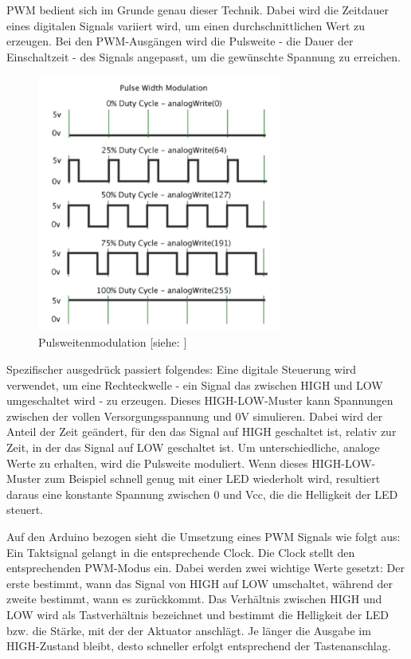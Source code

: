 \ac{PWM} bedient sich im Grunde genau dieser Technik.
Dabei wird die Zeitdauer eines digitalen Signals variiert wird, um einen durchschnittlichen Wert zu erzeugen.
Bei den \ac{PWM}-Ausgängen wird die Pulsweite - die Dauer der Einschaltzeit - des Signals angepasst, um die gewünschte Spannung zu erreichen.

\begin{figure}[htbp]
	\centering
	\includegraphics [width=8cm] {img/pulsweite}
	\caption{Pulsweitenmodulation [siehe: \cite*[siehe ][]{PWM}]}
	\label{fig:pulsweite}
\end{figure}

Spezifischer ausgedrück passiert folgendes:
Eine digitale Steuerung wird verwendet, um eine Rechteckwelle - ein Signal das zwischen HIGH und LOW umgeschaltet wird - zu erzeugen.
Dieses HIGH-LOW-Muster kann Spannungen zwischen der vollen Versorgungsspannung und 0V simulieren.
Dabei wird der Anteil der Zeit geändert, für den das Signal auf HIGH geschaltet ist, relativ zur Zeit, in der das Signal auf LOW geschaltet ist.
Um unterschiedliche, analoge Werte zu erhalten, wird die Pulsweite moduliert.
Wenn dieses HIGH-LOW-Muster zum Beispiel schnell genug mit einer LED wiederholt wird, resultiert daraus eine konstante Spannung zwischen 0 und Vcc, die die Helligkeit der LED steuert. %

Auf den Arduino bezogen sieht die Umsetzung eines \ac{PWM} Signals wie folgt aus:
Ein Taktsignal gelangt in die entsprechende Clock.
Die Clock stellt den entsprechenden \ac{PWM}-Modus ein.
Dabei werden zwei wichtige Werte gesetzt:
Der erste bestimmt, wann das Signal von HIGH auf LOW umschaltet, während der zweite bestimmt, wann es zurückkommt.
Das Verhältnis zwischen HIGH und LOW wird als Tastverhältnis bezeichnet und bestimmt die Helligkeit der LED bzw. die Stärke, mit der der Aktuator anschlägt.
Je länger die Ausgabe im HIGH-Zustand bleibt, desto schneller erfolgt entsprechend der Tastenanschlag.

